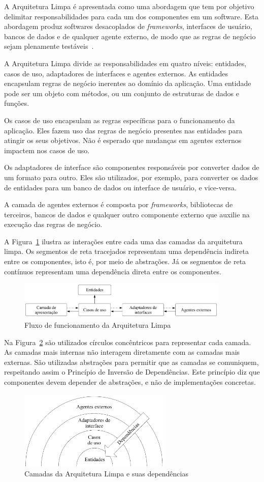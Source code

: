 A Arquitetura Limpa é apresentada como uma abordagem que tem por objetivo delimitar responsabilidades para cada um dos componentes em um software.
Esta abordagem produz softwares desacoplados de \emph{frameworks}, interfaces de usuário, bancos de dados e de qualquer agente externo, de modo que as regras de negócio sejam plenamente testáveis~\cite{clean-arch-book}.

A Arquitetura Limpa divide as responsabilidades em quatro níveis: entidades, casos de uso, adaptadores de interfaces e agentes externos.
As entidades encapsulam regras de negócio inerentes ao domínio da aplicação.
Uma entidade pode ser um objeto com métodos, ou um conjunto de estruturas de dados e funções.

Os casos de uso encapsulam as regras específicas para o funcionamento da aplicação.
Eles fazem uso das regras de negócio presentes nas entidades para atingir os seus objetivos.
Não é esperado que mudanças em agentes externos impactem nos casos de uso.

Os adaptadores de interface são componentes responsáveis por converter dados de um formato para outro.
Eles são utilizados, por exemplo, para converter os dados de entidades para um banco de dados ou interface de usuário, e vice-versa.

A camada de agentes externos é composta por \emph{frameworks}, bibliotecas de terceiros, bancos de dados e qualquer outro componente externo que auxilie na execução das regras de negócio.

A Figura~\ref{fig:clean_arch} ilustra as interações entre cada uma das camadas da arquitetura limpa.
Os segmentos de reta tracejados representam uma dependência indireta entre os componentes, isto é, por meio de abstrações.
Já os segmentos de reta contínuos representam uma dependência direta entre os componentes.

\begin{figure}[ht]
	\centering
	\includegraphics[width=0.9\textwidth]{images/clean_arch.png}
	\caption{Fluxo de funcionamento da Arquitetura Limpa}
	\label{fig:clean_arch}
\end{figure}

Na Figura~\ref{fig:clean_arch_circles} são utilizados círculos concêntricos para representar cada camada.
As camadas mais internas não interagem diretamente com as camadas mais externas.
São utilizadas abstrações para permitir que as camadas se comuniquem, respeitando assim o Princípio de Inversão de Dependências.
Este princípio diz que componentes devem depender de abstrações, e não de implementações concretas.

\begin{figure}[ht]
	\centering
	\includegraphics[width=0.65\textwidth]{images/clean_arch_circles.png}
	\caption{Camadas da Arquitetura Limpa e suas dependências}
	\label{fig:clean_arch_circles}
\end{figure}
